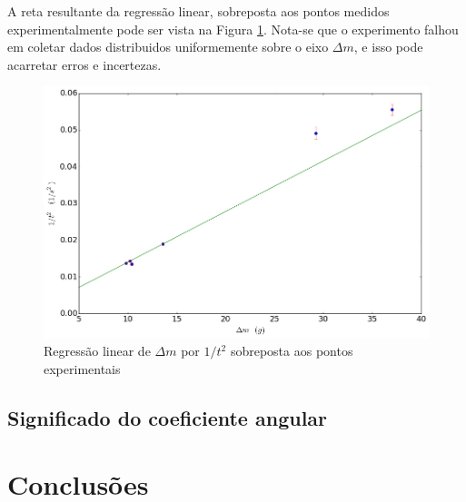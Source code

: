 \documentclass[12pt,a4paper]{article}
\begin{document}
A reta resultante da regressão linear, sobreposta aos pontos medidos experimentalmente pode ser vista na Figura \ref{grafico}. Nota-se que o experimento falhou em coletar dados distribuidos uniformemente sobre o eixo $ \Delta m$, e isso pode acarretar erros e incertezas.

\begin{figure}
\includegraphics[scale=0.55]{grafico.png}
\caption{Regressão linear de $\Delta m$ por $1/t^2$ sobreposta aos pontos experimentais}
\label{grafico}
\end{figure}

\subsection{Significado do coeficiente angular}

\section{Conclusões}
\end{document}
